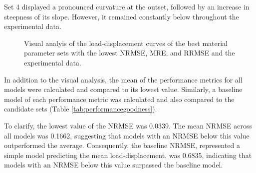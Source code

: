 Set \SI{4}{} displayed a pronounced curvature at the outset, followed by an increase in steepness of its slope.
However, it remained constantly below throughout the experimental data.\\

\begin{figure}%
    \centering
   \quad
   \caption[Best material parameter sets load-displacement curves]{Visual analyis of the load-displacement curves of the best material parameter sets with the lowest NRMSE, MRE, and RRMSE and the experimental data.}%
   \label{fig:bestfitcandidatescurve}%
\end{figure}

In addition to the visual analysis, the mean of the performance metrics for all models were calculated and 
compared to its lowest value. Similarly, a baseline model of each performance metric was calculated and 
also compared to the candidate sets (Table \ref{tab:performancegoodness}). 

To clarify, the lowest value of the NRMSE was \SI{0.0339}{}. The mean NRMSE across all models was 
\SI{0.1662}{}, suggesting that models with an NRMSE below this value outperformed the average.
Consequently, the baseline NRMSE, represented a simple model predicting the mean load-displacement, was 
\SI{0.6835}{}, indicating that models with an NRMSE below this value surpassed the baseline model.\\ 

